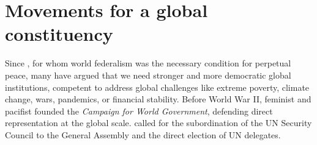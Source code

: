 \documentclass[12pt,english]{article}
\begin{document}


\section{Movements for a global constituency}
Since \citet{kant_zum_1795}, for whom world federalism was the necessary condition for perpetual peace, many have argued that we need stronger and more democratic global institutions, competent to address global challenges like extreme poverty, climate change, wars, pandemics, or financial stability. 
Before World War II, feminist and pacifist \citet{maverick_lloyd_chaos_1937} founded the \textit{Campaign for World Government}, defending direct representation at the global scale. 
\citet{einstein_general_1947} called for the subordination of the UN Security Council to the General Assembly and the direct election of UN delegates. 
\end{document}
